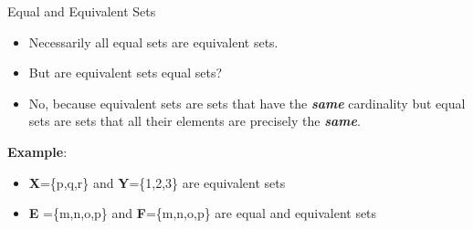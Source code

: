 

{Equal and Equivalent Sets}


\begin{itemize}
\item Necessarily all equal sets are equivalent sets.
\item But are equivalent sets equal sets?

\item No, because equivalent sets are sets that have the \textit{\textbf{same}} cardinality but equal sets are sets that all
their elements are precisely the \textit{\textbf{same}}. 
\end{itemize}

\textbf{Example}:
\begin{itemize} \item \textbf{X}=\{p,q,r\} and \textbf{Y}=\{1,2,3\} are equivalent sets 
\item \textbf{E} =\{m,n,o,p\}
and \textbf{F}=\{m,n,o,p\} are equal and equivalent sets
\end{itemize}

